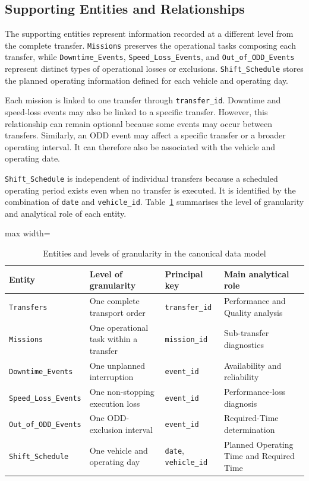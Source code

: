 \subsection{Supporting Entities and Relationships}
\label{subsec:supporting-entities-and-relationships}
The supporting entities represent information recorded at a different level from the complete transfer. \texttt{Missions} preserves the operational tasks composing each transfer, while \texttt{Downtime\_Events}, \texttt{Speed\_Loss\_Events}, and \texttt{Out\_of\_ODD\_Events} represent distinct types of operational losses or exclusions. \texttt{Shift\_Schedule} stores the planned operating information defined for each vehicle and operating day.

Each mission is linked to one transfer through \texttt{transfer\_id}. Downtime and speed-loss events may also be linked to a specific transfer. However, this relationship can remain optional because some events may occur between transfers. Similarly, an ODD event may affect a specific transfer or a broader operating interval. It can therefore also be associated with the vehicle and operating date.

\texttt{Shift\_Schedule} is independent of individual transfers because a scheduled operating period exists even when no transfer is executed. It is identified by the combination of \texttt{date} and \texttt{vehicle\_id}. Table~\ref{tab:canonical-entity-granularity} summarises the level of granularity and analytical role of each entity.

\begin{table}[H]
\small
\renewcommand{\arraystretch}{1.3}
\centering
\caption{Entities and levels of granularity in the canonical data model}
\label{tab:canonical-entity-granularity}
\begin{adjustbox}{max width=\textwidth}
\begin{tabular}{|p{3.5cm}|p{4.3cm}|p{3.0cm}|p{4.2cm}|}
\hline
\textbf{Entity} & \textbf{Level of granularity} & \textbf{Principal key} & \textbf{Main analytical role} \\
\hline
\texttt{Transfers} & One complete transport order & \texttt{transfer\_id} & Performance and Quality analysis \\
\hline
\texttt{Missions} & One operational task within a transfer & \texttt{mission\_id} & Sub-transfer diagnostics \\
\hline
\texttt{Downtime\_Events} & One unplanned interruption & \texttt{event\_id} & Availability and reliability \\
\hline
\texttt{Speed\_Loss\_Events} & One non-stopping execution loss & \texttt{event\_id} & Performance-loss diagnosis \\
\hline
\texttt{Out\_of\_ODD\_Events} & One ODD-exclusion interval & \texttt{event\_id} & Required-Time determination \\
\hline
\texttt{Shift\_Schedule} & One vehicle and operating day & \texttt{date}, \texttt{vehicle\_id} & Planned Operating Time and Required Time \\
\hline
\end{tabular}
\end{adjustbox}
\end{table}

